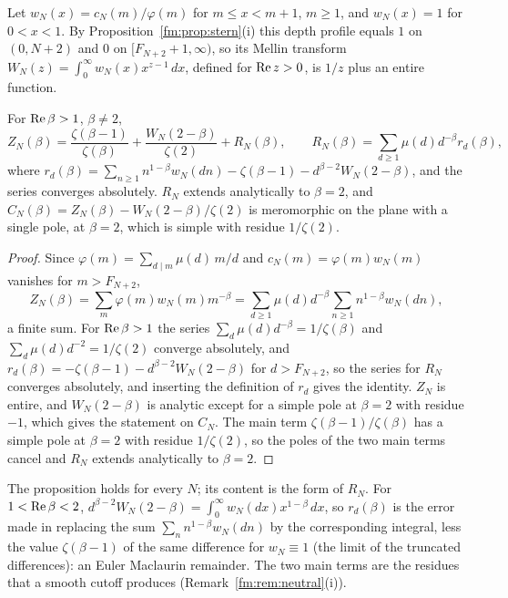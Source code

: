 Let $w_N(x)=c_N(m)/\varphi(m)$ for $m\le x<m+1$, $m\ge1$, and $w_N(x)=1$ for $0<x<1$. By Proposition~\ref{fm:prop:stern}(i) this depth profile equals $1$ on $(0,N+2)$ and $0$ on $[F_{N+2}+1,\infty)$, so its Mellin transform $W_N(z)=\int_0^\infty w_N(x)x^{z-1}\,dx$, defined for $\operatorname{Re} z>0$, is $1/z$ plus an entire function.

\begin{proposition}\label{fm:prop:perron}
For $\operatorname{Re}\beta>1$, $\beta\ne2$,
\[
Z_N(\beta)=\frac{\zeta(\beta-1)}{\zeta(\beta)}+\frac{W_N(2-\beta)}{\zeta(2)}+R_N(\beta),\qquad R_N(\beta)=\sum_{d\ge1}\mu(d)d^{-\beta}r_d(\beta),
\]
where $r_d(\beta)=\sum_{n\ge1}n^{1-\beta}w_N(dn)-\zeta(\beta-1)-d^{\beta-2}W_N(2-\beta)$, and the series converges absolutely. $R_N$ extends analytically to $\beta=2$, and $C_N(\beta)=Z_N(\beta)-W_N(2-\beta)/\zeta(2)$ is meromorphic on the plane with a single pole, at $\beta=2$, which is simple with residue $1/\zeta(2)$.
\end{proposition}

\begin{proof}
Since $\varphi(m)=\sum_{d\mid m}\mu(d)\,m/d$ and $c_N(m)=\varphi(m)w_N(m)$ vanishes for $m>F_{N+2}$,
\[
Z_N(\beta)=\sum_m\varphi(m)w_N(m)m^{-\beta}=\sum_{d\ge1}\mu(d)d^{-\beta}\sum_{n\ge1}n^{1-\beta}w_N(dn),
\]
a finite sum. For $\operatorname{Re}\beta>1$ the series $\sum_d\mu(d)d^{-\beta}=1/\zeta(\beta)$ and $\sum_d\mu(d)d^{-2}=1/\zeta(2)$ converge absolutely, and $r_d(\beta)=-\zeta(\beta-1)-d^{\beta-2}W_N(2-\beta)$ for $d>F_{N+2}$, so the series for $R_N$ converges absolutely, and inserting the definition of $r_d$ gives the identity. $Z_N$ is entire, and $W_N(2-\beta)$ is analytic except for a simple pole at $\beta=2$ with residue $-1$, which gives the statement on $C_N$. The main term $\zeta(\beta-1)/\zeta(\beta)$ has a simple pole at $\beta=2$ with residue $1/\zeta(2)$, so the poles of the two main terms cancel and $R_N$ extends analytically to $\beta=2$.
\end{proof}

The proposition holds for every $N$; its content is the form of $R_N$. For $1<\operatorname{Re}\beta<2$, $d^{\beta-2}W_N(2-\beta)=\int_0^\infty w_N(dx)x^{1-\beta}\,dx$, so $r_d(\beta)$ is the error made in replacing the sum $\sum_nn^{1-\beta}w_N(dn)$ by the corresponding integral, less the value $\zeta(\beta-1)$ of the same difference for $w_N\equiv1$ (the limit of the truncated differences): an Euler Maclaurin remainder. The two main terms are the residues that a smooth cutoff produces (Remark~\ref{fm:rem:neutral}(i)).

